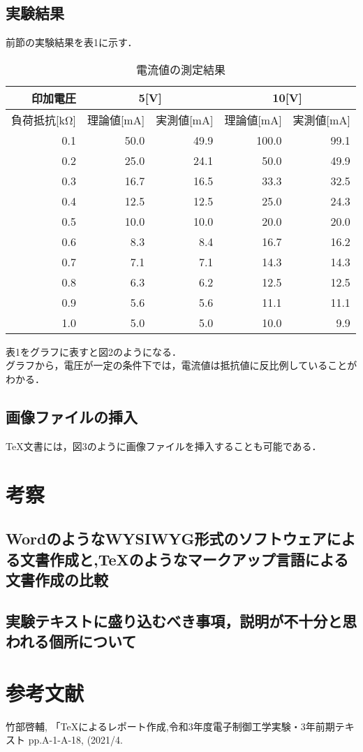 \documentclass[titlepage]{jarticle}
\begin{document}
\newpage

\subsection{実験結果}
前節の実験結果を表1に示す．

\begin{table}[h]
\caption{電流値の測定結果}
\begin{center}
\renewcommand{\arraystretch}{0.7}
\begin{tabular}{r||r|r||r|r}
\hline
印加電圧 &
\multicolumn{2}{c||}{5[V]} &
\multicolumn{2}{c}{10[V]}
\\\hline
負荷抵抗[kΩ] & 理論値[mA] & 実測値[mA] & 理論値[mA] & 実測値[mA]
\\\hline
0.1 & 50.0 & 49.9 & 100.0 & 99.1\\
0.2 & 25.0 & 24.1 & 50.0 & 49.9\\
0.3 & 16.7 & 16.5 & 33.3 & 32.5\\
0.4 & 12.5 & 12.5 & 25.0 & 24.3\\
0.5 & 10.0 & 10.0 & 20.0 & 20.0\\
0.6 & 8.3 & 8.4 & 16.7 & 16.2\\
0.7 & 7.1 & 7.1 & 14.3 & 14.3\\
0.8 & 6.3 & 6.2 & 12.5 & 12.5\\
0.9 & 5.6 & 5.6 & 11.1 & 11.1\\
1.0 & 5.0 & 5.0 & 10.0 & 9.9\\
\hline
\end{tabular}
\end{center}
\end{table}

表1をグラフに表すと図2のようになる．\\
グラフから，電圧が一定の条件下では，電流値は抵抗値に反比例していることがわかる．

\subsection{画像ファイルの挿入}
{\TeX}文書には，図3のように画像ファイルを挿入することも可能である．
\section{考察}
\subsection{WordのようなWYSIWYG形式のソフトウェアによる文書作成と,{\TeX}のようなマークアップ言語による文書作成の比較}
\subsection{実験テキストに盛り込むべき事項，説明が不十分と思われる個所について}

\section*{参考文献}
\begin{thebibliography}{99}
  竹部啓輔, 「{\TeX}によるレポート作成,令和3年度電子制御工学実験・3年前期テキスト pp.A-1-A-18, (2021/4.
\end{thebibliography}
\end{document}
